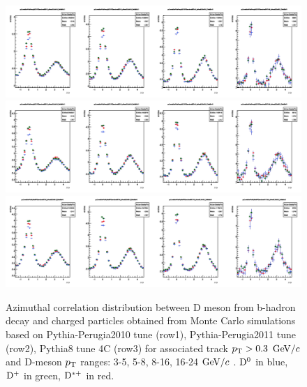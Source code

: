 \begin{figure}
\centering
\includegraphics[width=1\linewidth]{figures/Template/1DCompare_allDpTfromB_AssoPt_0dot3to99dot0GeVc_Perugia2010.png}
\includegraphics[width=1\linewidth]{figures/Template/1DCompare_allDpTfromB_AssoPt_0dot3to99dot0GeVc_Perugia2011.png}
\includegraphics[width=1\linewidth]{figures/Template/1DCompare_allDpTfromB_AssoPt_0dot3to99dot0GeVc_Pythia8.png}
\caption{Azimuthal correlation distribution between D meson from b-hadron decay and charged particles obtained from Monte Carlo simulations
based on Pythia-Perugia2010 tune (row1), Pythia-Perugia2011 tune (row2), Pythia8 tune 4C (row3) for associated track $p_{\rm T} > 0.3$ $\mathrm{GeV}/c$  and D-meson $p_{\rm T}$ ranges: 3-5, 5-8, 8-16, 16-24 $\mathrm{GeV}/c$ . ${\rm D^0}$ in blue, ${\rm D^+}$ in green, ${\rm D^{*+}}$ in red.}
\label{templates1}
\end{figure}

